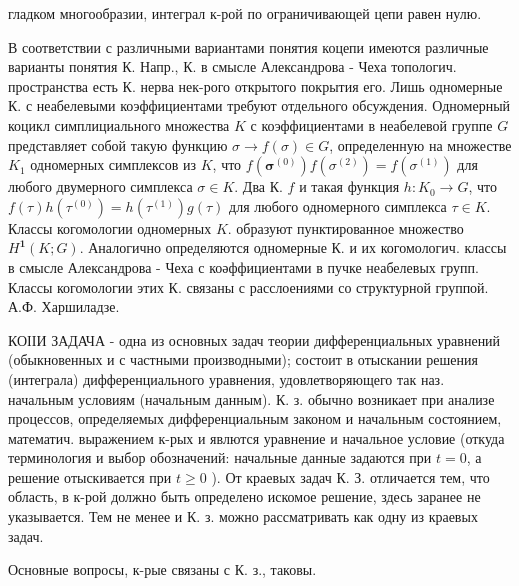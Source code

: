 \documentclass[10pt]{article}
\begin{document}
гладком многообразии, интеграл к-рой по ограничивающей цепи равен нулю.



В соответствии с различными вариантами понятия коцепи имеются различные варианты понятия К. Напр., К. в смысле Александрова - Чеха топологич. пространства есть К. нерва нек-рого открытого покрытия его. Лишь одномерные К. с неабелевыми коэффициентами требуют отдельного обсуждения. Одномерный коцикл симплициального множества $K$ с коэффициентами в неабелевой группе $G$ представляет собой такую функцию $\sigma \rightarrow f(\sigma) \in G$, определенную на множестве $K_{1}$ одномерных симплексов из $K$, что $f\left(\boldsymbol{\sigma}^{(0)}\right) f\left(\sigma^{(2)}\right)=f\left(\sigma^{(1)}\right)$ для любого двумерного симплекса $\sigma \in K$. Два К. $f$ и такая функция $h: K_{0} \rightarrow G$, что $f(\tau) h\left(\tau^{(0)}\right)=h\left(\tau^{(1)}\right) g(\tau)$ для любого одномерного симплекса $\tau \in K$. Классы когомологии одномерных $K$. образуют пунктированное множество $H^{\mathbf{1}}(K ; G)$. Аналогично определяются одномерные К. и их когомологич. классы в смысле Александрова - Чеха с коәффициентами в пучке неабелевых групп. Классы когомологии этих К. связаны с расслоениями со структурной группой. А.Ф. Харшиладзе.



КОІІИ ЗАДАЧА - одна из основных задач теории дифференциальных уравнений (обыкновенных и с частными производными); состоит в отыскании решения (интеграла) дифференциального уравнения, удовлетворяющего так наз. начальным условиям (начальным данным). К. з. обычно возникает при анализе процессов, определяемых дифференциальным законом и начальным состоянием, математич. выражением к-рых и явлются уравнение и начальное условие (откуда терминология и выбор обозначений: начальные данные задаются при $t=0$, а решение отыскивается при $t \geqslant 0$ ). От краевых задач К. З. отличается тем, что область, в к-рой должно быть определено искомое решение, здесь заранее не указывается. Тем не менее и К. з. можно рассматривать как одну из краевых задач.



Основные вопросы, к-рые связаны с К. з., таковы.
\end{document}
